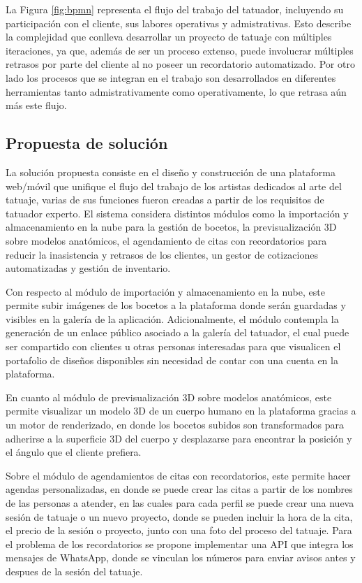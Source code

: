 La Figura \ref{fig:bpmn} representa el flujo del trabajo del tatuador, incluyendo su participación con el cliente, sus labores operativas y admistrativas. Esto describe la complejidad que conlleva desarrollar un proyecto de tatuaje con múltiples iteraciones, ya que, además de ser un proceso extenso, puede involucrar múltiples retrasos por parte del cliente al no poseer un recordatorio automatizado. Por otro lado los procesos que se integran en el trabajo son desarrollados en diferentes herramientas tanto admistrativamente como operativamente, lo que retrasa aún más este flujo.

\subsection{Propuesta de solución }

La solución propuesta consiste en el diseño y construcción de una plataforma web/móvil que unifique el flujo del trabajo de los artistas dedicados al arte del tatuaje, varias de sus funciones fueron creadas a partir de los requisitos de tatuador experto. El sistema considera distintos módulos como la importación y almacenamiento en la nube para la gestión de bocetos, la previsualización 3D sobre modelos anatómicos, el agendamiento de citas con recordatorios para reducir la inasistencia y retrasos de los clientes, un gestor de cotizaciones automatizadas y gestión de inventario.

Con respecto al módulo de importación y almacenamiento en la nube, este permite subir imágenes de los bocetos a la plataforma donde serán guardadas y visibles en la galería de la aplicación. Adicionalmente, el módulo contempla la generación de un enlace público asociado a la galería del tatuador, el cual puede ser compartido con clientes u otras personas interesadas para que visualicen el portafolio de diseños disponibles sin necesidad de contar con una cuenta en la plataforma.

En cuanto al módulo de previsualización 3D sobre modelos anatómicos, este permite visualizar un modelo 3D de un cuerpo humano en la plataforma gracias a un motor de renderizado, en donde los bocetos subidos son transformados para adherirse a la superficie 3D del cuerpo y desplazarse para encontrar la posición y el ángulo que el cliente prefiera.

Sobre el módulo de agendamientos de citas con recordatorios, este permite hacer agendas personalizadas, en donde se puede crear las citas a partir de los nombres de las personas a atender, en las cuales para cada perfil se puede crear una nueva sesión de tatuaje o un nuevo proyecto, donde se pueden incluir la hora de la cita, el precio de la sesión o proyecto, junto con una foto del proceso del tatuaje. Para el problema de los recordatorios se propone implementar una API que integra los mensajes de WhatsApp\cite{whatsapp}, donde se vinculan los números para enviar avisos antes y despues de la sesión del tatuaje.

